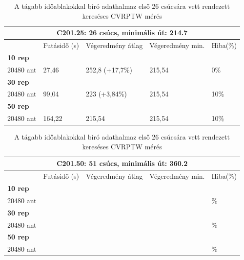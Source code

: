 \begin{table}[ht!]
	\centering
	\begin{tabular}{|p{1.75cm}||p{2cm}|p{3.25cm}|p{3.25cm}|p{1.5cm}|}
		\hline
		\multicolumn{5}{|c|}{C201.25: 26 csúcs, minimális út: 214.7} \\
		\hline
		& Futásidő (s) & Végeredmény átlag & Végeredmény min. & Hiba(\%) \\
		\hline
		\textbf{10 rep} &  &  &  & \\
		20480 ant & 27,46 & 252,8 (+17,7\%) & 215,54 &  0\% \\
		\hline
		\textbf{30 rep} &  &  &  & \\
		20480 ant & 99,04 & 223 (+3,84\%) & 215,54 &  10\% \\
		\hline
		\textbf{50 rep} &  &  &  &  \\
		20480 ant & 164,22 & 215,54 & 215,54 &  10\% \\
		\hline
	\end{tabular}
	\caption{A tágabb időablakokkal bíró adathalmaz első 26 csúcsára vett rendezett kereséses CVRPTW mérés}
	\label{table:VRTPW2_25_2}
\end{table}

\begin{table}[ht!]
	\centering
	\begin{tabular}{|p{1.75cm}||p{2cm}|p{3.25cm}|p{3.25cm}|p{1.5cm}|}
		\hline
		\multicolumn{5}{|c|}{C201.50: 51 csúcs, minimális út: 360.2} \\
		\hline
		& Futásidő (s) & Végeredmény átlag & Végeredmény min. & Hiba(\%) \\
		\hline
		\textbf{10 rep} &  &  &  & \\
		20480 ant &  &  &  &  \% \\
		\hline
		\textbf{30 rep} &  &  &  & \\
		20480 ant &  &  &  &  \% \\
		\hline
		\textbf{50 rep} &  &  &  &  \\
		20480 ant &  &  &  &  \% \\
		\hline
	\end{tabular}
	\caption{A tágabb időablakokkal bíró adathalmaz első 26 csúcsára vett rendezett kereséses CVRPTW mérés}
	\label{table:VRTPW2_50_2}
\end{table}

